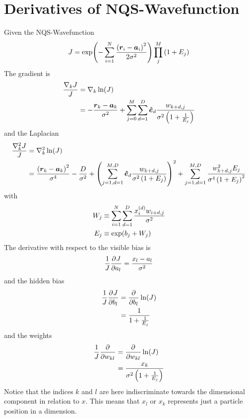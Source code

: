 \section{Derivatives of NQS-Wavefunction}
    Given the NQS-Wavefunction
        \begin{equation}
            J = \exp(-\suml{i=1}{N} \frac{\left(\blds{r}_i -
            \blds{a}_i\right)^2}{2\sigma^2})\prod\limits^{M}_j \left(1 +
            E_j\right)
        \end{equation}
    The gradient is
        \begin{align}
            \frac{\nabla_k J}{J} &= \nabla_k \ln(J) \nonumber \\
            &= -\frac{\blds{r}_k - \blds{a}_k}{\sigma^2} +
            \suml{j=0}{M}\suml{d=1}{D} \blds{\hat{e}}_d
            \frac{w_{k+d,j}}{\sigma^2\left(1 + \frac{1}{E_j}\right)}
        \end{align}
    and the Laplacian
        \begin{align}
            \frac{\nabla^2_k J}{J} &= \nabla^2_k \ln(J) \nonumber \\
            &= \frac{\left(\blds{r}_k - \blds{a}_k\right)^2}{\sigma^4} -
            \frac{D}{\sigma^2} + \left(\suml{j=1,d=1}{M,D} \blds{\hat{e}}_d
            \frac{w_{k+d,j}}{\sigma^2\left(1 + E_j\right)}\right)^2 +
            \suml{j=1,d=1}{M,D} \frac{w^2_{k+d,j}E_j}{\sigma^4\left(1 +
            E_j\right)^2}
        \end{align}
    with 
        \begin{equation}
            \begin{aligned}
                W_j &\equiv \suml{i=1}{N}\suml{d=1}{D}
                \frac{x^{(d)}_iw_{i+d,j}}{\sigma^2} \\
                E_j &\equiv \exp(b_j + W_j)
            \end{aligned}
        \end{equation}
    The derivative with respect to the visible bias is
        \begin{equation}
            \frac{1}{J}\prd{a_l}[J] = \frac{x_l - a_l}{\sigma^2}
        \end{equation}
    and the hidden bias
        \begin{align}
            \frac{1}{J}\prd{b_l}[J] &= \prd{b_l}\ln(J) \nonumber \\
            &= \frac{1}{1 + \frac{1}{E_j}}
        \end{align}
    and the weights
        \begin{align}
            \frac{1}{J}\prd{w_{kl}} &= \prd{w_{kl}}\ln(J) \nonumber \\
            &= \frac{x_k}{\sigma^2\left(1 + \frac{1}{E_j}\right)}
        \end{align}
    Notice that the indices $k$ and $l$ are here indiscriminate towards the
    dimensional component in relation to $x$. This means that $x_l$ or $x_k$
    represents just a particle position in a dimension.

